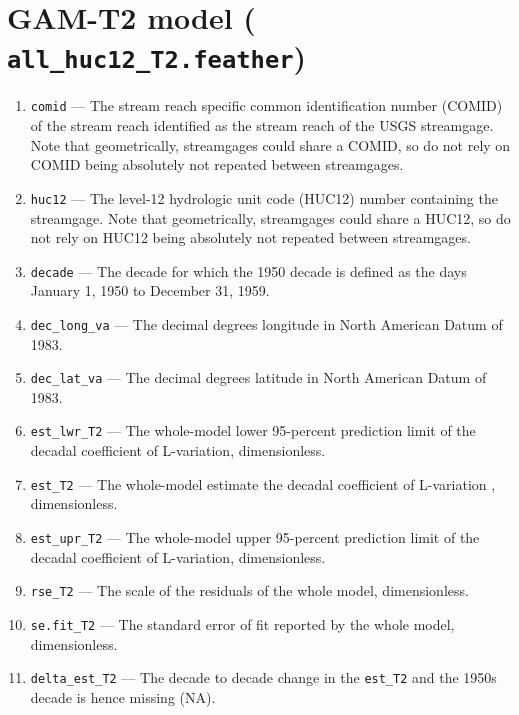 \documentclass[1p, authoryear, 11pt, times, preprint]{elsarticle}
\newcommand{\code}[1]{{\color{black}%
                       \mbox{\lstinline[basicstyle={\small\ttfamily},
                                        keywordstyle=\scriptsize\ttfamily]|#1|}}}
\begin{document}
\section{GAM-T2 model (\code{all_huc12_T2.feather})}
\begin{enumerate}
\footnotesize
\RaggedRight
\item \code{comid} --- The stream reach specific common identification number (COMID) of the stream reach identified as the stream reach of the USGS streamgage. Note that geometrically, streamgages could share a COMID, so do not rely on COMID being absolutely not repeated between streamgages.
\item \code{huc12} --- The level-12 hydrologic unit code (HUC12) number containing the streamgage. Note that geometrically, streamgages could share a HUC12, so do not rely on HUC12 being absolutely not repeated between streamgages.
\item \code{decade} --- The decade for which the 1950 decade is defined as the days January 1, 1950 to December 31, 1959.
\item \code{dec_long_va} --- The decimal degrees longitude in North American Datum of 1983.
\item \code{dec_lat_va} --- The decimal degrees latitude in North American Datum of 1983.
\item \code{est_lwr_T2} --- The whole-model lower 95-percent prediction limit of the decadal coefficient of L-variation, dimensionless.
\item \code{est_T2} --- The whole-model estimate the decadal coefficient of L-variation , dimensionless.
\item \code{est_upr_T2} --- The whole-model upper 95-percent prediction limit of the decadal coefficient of L-variation, dimensionless.
\item \code{rse_T2} --- The scale of the residuals of the whole model, dimensionless.
\item \code{se.fit_T2} --- The standard error of fit reported by the whole model, dimensionless.
\item \code{delta_est_T2} --- The decade to decade change in the \code{est_T2} and the 1950s decade is hence missing (NA).
\end{enumerate}

 
\end{document}
